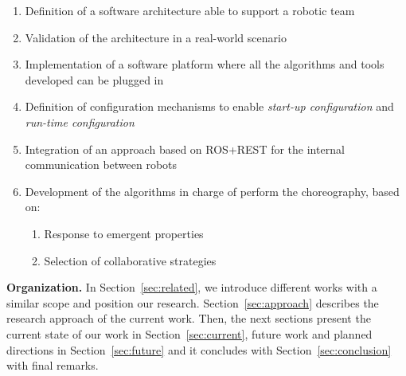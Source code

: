 \begin{enumerate}
\item Definition of a software architecture able to support a robotic team
\item Validation of the architecture in a real-world scenario
\item Implementation of a software platform where all the algorithms and tools developed can be plugged in 
\item Definition of configuration mechanisms to enable \emph{start-up configuration} and \emph{run-time configuration}
\item Integration of an approach based on ROS+REST for the internal communication between robots
\item Development of the algorithms in charge of perform the choreography, based on:
\begin{enumerate}
\item Response to emergent properties
\item Selection of collaborative strategies
\end{enumerate}
\end{enumerate}

\textbf{Organization.} 
In Section~\ref{sec:related}, we introduce different works with a similar scope and position our research.
Section~\ref{sec:approach} describes the research approach of the current work.
Then, the next sections present the current state of our work in Section~\ref{sec:current}, future work and planned directions in Section~\ref{sec:future} and it concludes with Section~\ref{sec:conclusion} with final remarks.